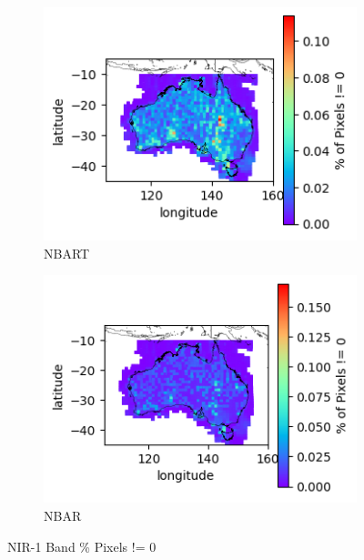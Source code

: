 \documentclass[a4paper]{article}
\begin{document}
      \begin{figure}[h!]
        \centering
          \begin{subfigure}[l]{.4\linewidth}
            \hspace{-32mm}
            \includegraphics[scale=0.9]{plots/nbart/nbart_nir_1-PercentDifferent.png}
            \caption{NBART}
          \end{subfigure}
%
          \begin{subfigure}[r]{.4\linewidth}
            \includegraphics[scale=0.9]{plots/nbar/nbar_nir_1-PercentDifferent.png}
            \caption{NBAR}
          \end{subfigure}
        \caption{NIR-1 Band \% Pixels != 0}\label{figure:30}
      \end{figure}

  \clearpage
\end{document}
